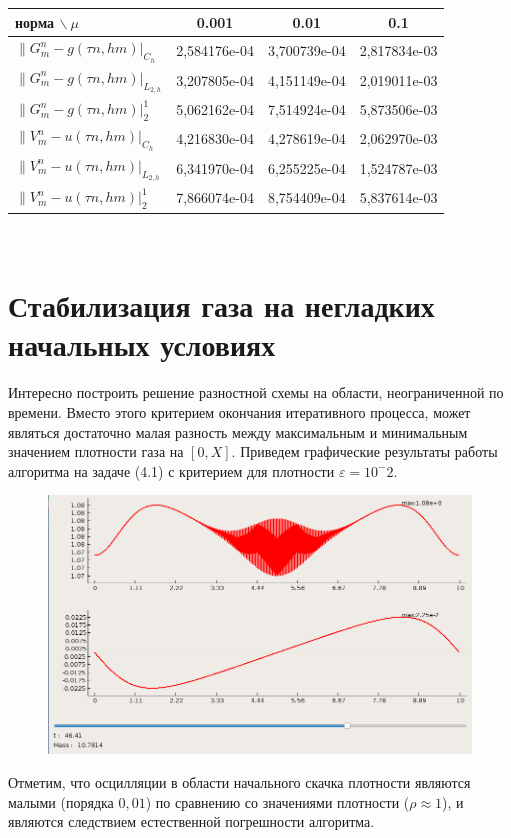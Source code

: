 \documentclass[a4paper, 11pt]{article}
\begin{document}
\begin{tabular}{|l|c|c|c|}
\hline
норма $\backslash \ \mu$ 					& 0.001      & 0.01       & 0.1 \\
\hline
$\|G_m^n - g (\tau n, hm)|_{C_h}$ 			& 2,584176e-04 & 3,700739e-04 & 2,817834e-03 \\
\hline
$\|G_m^n - g (\tau n, hm)|_{L_{2,h}}$ 		& 3,207805e-04 & 4,151149e-04 & 2,019011e-03 \\
\hline
$\|G_m^n - g (\tau n, hm)|_2^1$ 			& 5,062162e-04 & 7,514924e-04 & 5,873506e-03 \\
\hline
$\|V_m^n - u (\tau n, hm)|_{C_h}$ 			& 4,216830e-04 & 4,278619e-04 & 2,062970e-03 \\
\hline
$\|V_m^n - u (\tau n, hm)|_{L_{2,h}}$ 		& 6,341970e-04 & 6,255225e-04 & 1,524787e-03 \\
\hline
$\|V_m^n - u (\tau n, hm)|_2^1$ 			& 7,866074e-04 & 8,754409e-04 & 5,837614e-03 \\
\hline
\end{tabular}\\

\section{Стабилизация газа на негладких начальных условиях}
Интересно построить решение разностной схемы на области, неограниченной по времени. Вместо этого критерием окончания итеративного процесса, может являться достаточно малая разность между максимальным и минимальным значением плотности газа на $[0, X]$. Приведем графические результаты работы алгоритма на задаче (4.1) с критерием для плотности $\varepsilon = 10^-2$.
\begin{figure}[H]
	\includegraphics[width=1\linewidth]{p3/p3_rho_t=46,41.png}
\end{figure}
Отметим, что осцилляции в области начального скачка плотности являются малыми (порядка $0,01$) по сравнению со значениями плотности ($\rho \approx 1$), и являются следствием естественной погрешности алгоритма.
\end{document}
